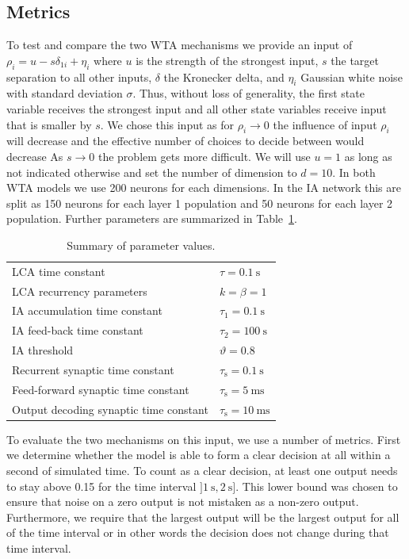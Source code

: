 \documentclass[10pt,letterpaper]{article}
\begin{document}
\subsection{Metrics}
To test and compare the two WTA mechanisms we provide an input of $\rho_i 
= u - s \delta_{1i} + \eta_i$ where $u$ is the strength of the strongest input, 
$s$ the target separation to all other inputs, $\delta$ the Kronecker delta, and 
$\eta_i$ Gaussian white noise with standard deviation $\sigma$. Thus, without 
loss of generality, the first state variable receives the strongest input and 
all other state variables receive input that is smaller by $s$. We chose this 
input as for $\rho_i \rightarrow 0$ the influence of input $\rho_i$ will 
decrease and the effective number of choices to decide between would decrease  
As $s \rightarrow 0$ the problem gets more difficult. We will use $u = 1$ as 
long as not indicated otherwise and set the number of dimension to $d = 10$.  In 
both WTA models we use 200 neurons for each dimensions. In the IA network this 
are split as 150 neurons for each layer 1 population and 50 neurons for each 
layer 2 population. Further parameters are summarized in Table~\ref{tbl:params}.
\begin{table}
    \caption{Summary of parameter values.}\label{tbl:params}
    \begin{tabular}{ll}
        LCA time constant & $\tau = \SI{0.1}{\second}$ \\
        LCA recurrency parameters & $k = \beta = 1$ \\
        IA accumulation time constant & $\tau_1 = \SI{0.1}{\second}$ \\
        IA feed-back time constant & $\tau_2 = \SI{100}{\second}$ \\
        IA threshold & $\vartheta = 0.8$ \\
        Recurrent synaptic time constant & $\tau_{\mathrm{s}} 
        = \SI{0.1}{\second}$ \\
        Feed-forward synaptic time constant & $\tau_{\mathrm{s}} 
        = \SI{5}{\milli\second}$ \\
        Output decoding synaptic time constant & $\tau_{\mathrm{s}} 
        = \SI{10}{\milli\second}$
    \end{tabular}
\end{table}

To evaluate the two mechanisms on this input, we use a number of metrics. First 
we determine whether the model is able to form a clear decision at all within 
a second of simulated time. To count as a clear decision, at least one output 
needs to stay above 0.15 for the time interval
$]\SI{1}{\second}, \SI{2}{\second}]$. %
This lower bound was chosen to ensure that noise on a zero output is not 
mistaken as a non-zero output.  Furthermore, we require that the largest output 
will be the largest output for all of the time interval or in other words the 
decision does not change during that time interval.
\end{document}
